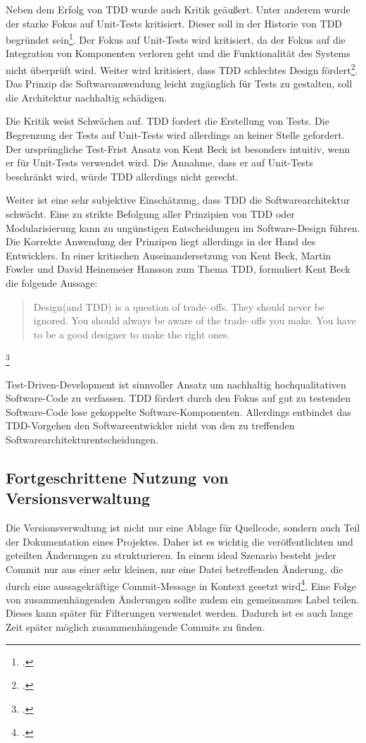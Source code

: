 Neben dem Erfolg von TDD wurde auch Kritik geäußert. Unter anderem wurde der starke Fokus auf Unit-Tests kritisiert. Dieser soll in der Historie von TDD begründet sein\footcite[vgl.][]{conciso-tdd-critique}. Der Fokus auf Unit-Tests wird kritisiert, da der Fokus auf die Integration von Komponenten verloren geht und die Funktionalität des Systems nicht überprüft wird. Weiter wird kritisiert, dass TDD schlechtes Design fördert\footcite[vgl.][]{hansson-tdd-is-dead}. Das Prinzip die Softwareanwendung leicht zugänglich für Tests zu gestalten, soll die Architektur nachhaltig schädigen.

Die Kritik weist Schwächen auf. TDD fordert die Erstellung von Tests. Die Begrenzung der Tests auf Unit-Tests wird allerdings an keiner Stelle gefordert. Der ursprüngliche Test-Frist Ansatz von Kent Beck ist besonders intuitiv, wenn er für Unit-Tests verwendet wird. Die Annahme, dass er auf Unit-Tests beschränkt wird, würde TDD allerdings nicht gerecht. 

Weiter ist eine sehr subjektive Einschätzung, dass TDD die Softwarearchitektur schwächt. Eine zu strikte Befolgung aller Prinzipien von TDD oder Modularisierung kann zu ungünstigen Entscheidungen im Software-Design führen. Die Korrekte Anwendung der Prinzipen liegt allerdings in der Hand des Entwicklers. In einer kritischen Auseinandersetzung von Kent Beck, Martin Fowler und David Heinemeier Hansson zum Thema TDD, formuliert Kent Beck die folgende Aussage:

\blockquote {Design(and TDD) is a question of trade–offs. They should never be ignored. You should always be aware of the trade–offs you make. You have to be a good designer to make the right ones.}\footcite[vgl.][S. 36]{aalborg-tdd-15-years}

Test-Driven-Development ist sinnvoller Ansatz um nachhaltig hochqualitativen Software-Code zu verfassen. TDD fördert durch den Fokus auf gut zu testenden Software-Code lose gekoppelte Software-Komponenten. Allerdings entbindet das TDD-Vorgehen den Softwareentwickler nicht von den zu treffenden Softwarearchitekturentscheidungen.

\subsection{Fortgeschrittene Nutzung von Versionsverwaltung}

Die Versionsverwaltung ist nicht nur eine Ablage für Quellcode, sondern auch Teil der Dokumentation eines Projektes. Daher ist es wichtig die veröffentlichten und geteilten Änderungen zu strukturieren. In einem ideal Szenario besteht jeder Commit nur aus einer sehr kleinen, nur eine Datei betreffenden Änderung, die durch eine aussagekräftige Commit-Message in Kontext gesetzt wird\footcite[vgl.][Kap. Making only one change per commit]{git-essentials-2017}. Eine Folge von zusammenhängenden Änderungen sollte zudem ein gemeinsames Label teilen. Dieses kann später für Filterungen verwendet werden. Dadurch ist es auch lange Zeit später möglich zusammenhängende Commits zu finden.

